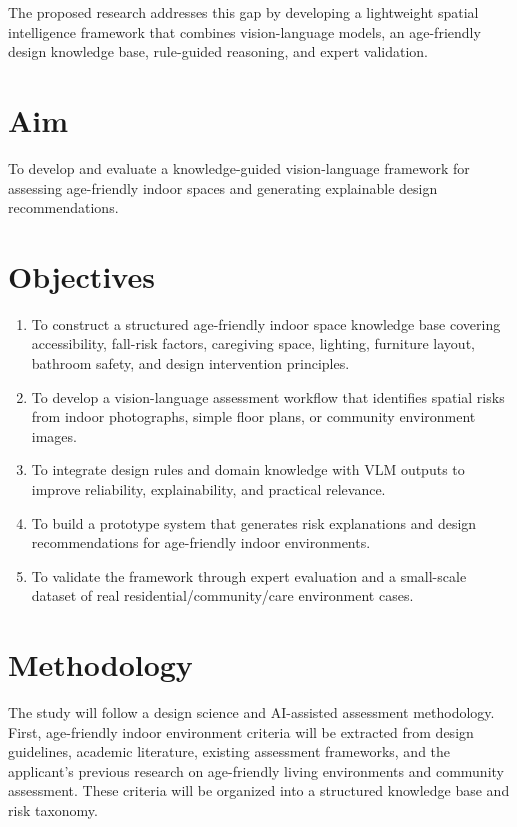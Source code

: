 \documentclass[11pt,a4paper]{article}
\begin{document}
The proposed research addresses this gap by developing a lightweight spatial intelligence framework that combines vision-language models, an age-friendly design knowledge base, rule-guided reasoning, and expert validation.

\section*{Aim}
To develop and evaluate a knowledge-guided vision-language framework for assessing age-friendly indoor spaces and generating explainable design recommendations.

\section*{Objectives}
\begin{enumerate}
  \item To construct a structured age-friendly indoor space knowledge base covering accessibility, fall-risk factors, caregiving space, lighting, furniture layout, bathroom safety, and design intervention principles.
  \item To develop a vision-language assessment workflow that identifies spatial risks from indoor photographs, simple floor plans, or community environment images.
  \item To integrate design rules and domain knowledge with VLM outputs to improve reliability, explainability, and practical relevance.
  \item To build a prototype system that generates risk explanations and design recommendations for age-friendly indoor environments.
  \item To validate the framework through expert evaluation and a small-scale dataset of real residential/community/care environment cases.
\end{enumerate}

\section*{Methodology}
The study will follow a design science and AI-assisted assessment methodology. First, age-friendly indoor environment criteria will be extracted from design guidelines, academic literature, existing assessment frameworks, and the applicant's previous research on age-friendly living environments and community assessment. These criteria will be organized into a structured knowledge base and risk taxonomy.
\end{document}
